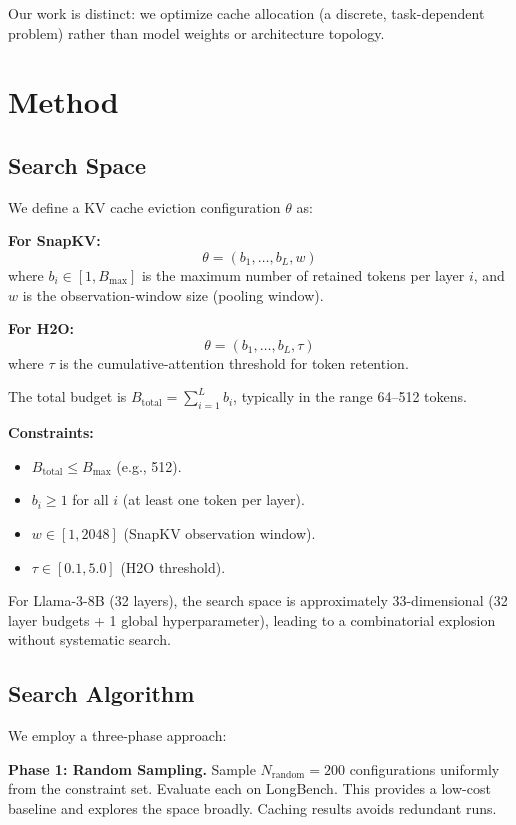 \documentclass[11pt,a4paper]{article}
\begin{document}
Our work is distinct: we optimize cache allocation (a discrete, task-dependent problem) rather than model weights or architecture topology.

\section{Method}

\subsection{Search Space}

We define a KV cache eviction configuration $\theta$ as:

\textbf{For SnapKV:}
\[
\theta = (b_1, \ldots, b_L, w)
\]
where $b_i \in [1, B_{\max}]$ is the maximum number of retained tokens per layer $i$, and $w$ is the observation-window size (pooling window).

\textbf{For H2O:}
\[
\theta = (b_1, \ldots, b_L, \tau)
\]
where $\tau$ is the cumulative-attention threshold for token retention.

The total budget is $B_{\text{total}} = \sum_{i=1}^L b_i$, typically in the range 64–512 tokens.

\textbf{Constraints:}
\begin{itemize}
    \item $B_{\text{total}} \leq B_{\max}$ (e.g., 512).
    \item $b_i \geq 1$ for all $i$ (at least one token per layer).
    \item $w \in [1, 2048]$ (SnapKV observation window).
    \item $\tau \in [0.1, 5.0]$ (H2O threshold).
\end{itemize}

For Llama-3-8B (32 layers), the search space is approximately $33$-dimensional (32 layer budgets + 1 global hyperparameter), leading to a combinatorial explosion without systematic search.

\subsection{Search Algorithm}

We employ a three-phase approach:

\textbf{Phase 1: Random Sampling.}
Sample $N_{\text{random}} = 200$ configurations uniformly from the constraint set. Evaluate each on LongBench. This provides a low-cost baseline and explores the space broadly. Caching results avoids redundant runs.
\end{document}
